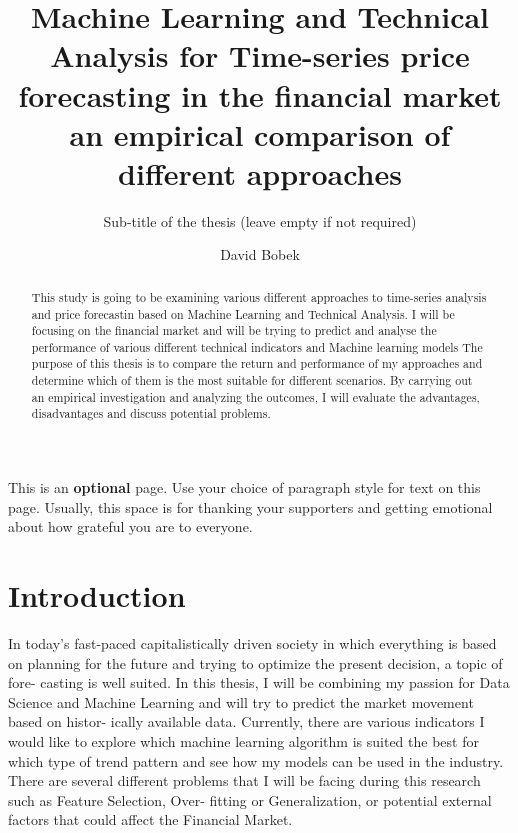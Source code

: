 \documentclass{imc-inf}
\title{Machine Learning and Technical Analysis for Time-series price forecasting in the financial market an empirical comparison of different approaches}
\subtitle{Sub-title of the thesis (leave empty if not required)}
\author{David Bobek}
\begin{document}
\frontmatter\maketitle{}


\begin{declarations}\end{declarations}



\begin{abstract}
	This study is going to be examining various different approaches to time-series analysis and price forecastin based on Machine Learning and Technical Analysis.
	I will be focusing on the financial market and will be trying to predict and analyse the performance of various different technical indicators and Machine learning models
	The purpose of this thesis is to compare the return and performance of my approaches and determine which of them is the most suitable for different scenarios.
	By carrying out an empirical investigation and analyzing the outcomes, I will evaluate the advantages, disadvantages and discuss potential problems.
\end{abstract}


\begin{acknowledgements}
This is an \textbf{optional} page. Use your choice of paragraph style for text on this page. Usually, this space is for thanking your supporters and getting emotional about how grateful you are to everyone.  
\end{acknowledgements}

%
\tableofcontents%
\clearpage


%
\listoftables
\clearpage


%
\listoffigures
\clearpage


\mainmatter%

\chapter{Introduction}\label{chap:introduction}

In today’s fast-paced capitalistically driven society in which everything is based on
planning for the future and trying to optimize the present decision, a topic of fore-
casting is well suited. In this thesis, I will be combining my passion for Data Science
and Machine Learning and will try to predict the market movement based on histor-
ically available data. Currently, there are various indicators I would like to explore
which machine learning algorithm is suited the best for which type of trend pattern
and see how my models can be used in the industry. There are several different
problems that I will be facing during this research such as Feature Selection, Over-
fitting or Generalization, or potential external factors that could affect the Financial Market.
\end{document}
